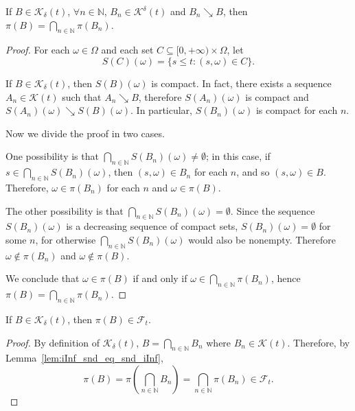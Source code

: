 \begin{lemma}\label{lem:iInf_snd_eq_snd_iInf}
  \leanok
If $B \in \mathcal{K}_\delta (t)$, $\forall n\in \mathbb{N}$, $B_n \in \mathcal{K}^\delta(t)$ and $B_n \searrow B$, then $\pi(B) = \bigcap_{n\in\mathbb{N}} \pi(B_n)$.
\end{lemma}

\begin{proof}

  For each $\omega \in \Omega$ and each set $C \subseteq [0,+\infty) \times \Omega$, let
  \[S(C)(\omega) = \{s \leq t : (s,\omega) \in C\}.\]

  If $B \in \mathcal{K}_\delta(t)$, then $S(B)(\omega)$
  is compact. In fact, there exists a sequence $A_n \in \mathcal{K}(t)$ such that
  $A_n \searrow B$, therefore $S(A_n)(\omega)$ is compact and $S(A_n)(\omega) \searrow S(B)(\omega)$. In particular, $S(B_n)(\omega)$ is compact for each $n$.

  Now we divide the proof in two cases.

  One possibility is that
  $\bigcap_{n \in \mathbb{N}} S(B_n)(\omega) \neq \emptyset$; in this case, if $s \in \bigcap_{n \in \mathbb{N}} S(B_n)(\omega)$,
  then $(s,\omega) \in B_n$ for each $n$, and so $(s,\omega) \in B$. Therefore,
  $\omega \in \pi(B_n)$ for each $n$ and $\omega \in \pi(B)$.

  The other possibility is that $\bigcap_{n \in \mathbb{N}} S(B_n)(\omega) = \emptyset$.
  Since the sequence $S(B_n)(\omega)$ is a decreasing sequence of compact sets,
    $S(B_n)(\omega) = \emptyset$ for some $n$,
  for otherwise $\bigcap_{n \in \mathbb{N}} S(B_n)(\omega)$ would also be nonempty.
  Therefore $\omega \notin \pi(B_n)$ and $\omega \notin \pi(B)$.

  We conclude that $\omega \in \pi(B)$ if and only if $\omega \in \bigcap_{n \in \mathbb{N}} \pi(B_n)$, hence $\pi(B) = \bigcap_{n \in \mathbb{N}} \pi(B_n)$.
\end{proof}

\begin{lemma}\label{lem:K_delta_of_inter_K_delta}
  \leanok
If $B \in \mathcal{K}_\delta (t)$, then $\pi(B) \in \mathcal{F}_t$.
\end{lemma}

\begin{proof}
  By definition of $\mathcal{K}_\delta(t)$, $B = \bigcap_{n\in\mathbb{N}} B_n$ where $B_n \in \mathcal{K}(t)$. Therefore, by Lemma~\ref{lem:iInf_snd_eq_snd_iInf}, \[\pi(B) = \pi \left(\bigcap_{n\in\mathbb{N}} B_n\right) = \bigcap_{n\in\mathbb{N}} \pi(B_n) \in \mathcal{F}_t .\]
\end{proof}

